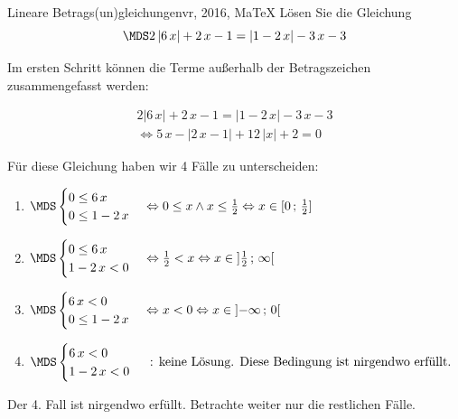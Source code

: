  \providecommand{\MoIl}[1][]{\mbox{}#1]\mathopen{}} 
 \providecommand{\MoIr}[1][]{#1[\mbox{}} 
 \providecommand{\MIntvlSep}{;} 
 \providecommand{\MElSetSep}{\, ; \, } 
 \begin{MAufgabe}{Lineare Betrags(un)gleichungen}{vr, 2016, MaTeX}
L\"osen Sie die Gleichung
$$
 \MDS 2\left| 6\, x \right|+2\, x - 1=  \left| 1 - 2\, x \right|  - 3\, x - 3
$$  

\ifLsg\MLoesung

Im ersten Schritt k\"onnen die Terme au\ss{}erhalb der Betragszeichen zusammengefasst werden:

\begin{align*} 
 2\left| 6\, x \right|+2\, x - 1=  \left| 1 - 2\, x \right|  - 3\, x - 3\\ 
\Leftrightarrow5\, x - \left|2\, x - 1\right| + 12\, \left|x\right| + 2= 0 
 \end{align*}

F\"ur diese Gleichung haben wir 4 F\"alle zu unterscheiden: 
\begin{enumerate}
\item $ \MDS 
\begin{cases} 
 0 \leq 6\, x\\ 
0 \leq 1 - 2\, x
 \end{cases}
\Leftrightarrow 0 \leq x \wedge x \leq \frac{1}{2}\Leftrightarrow x \in [ 0 \, \MIntvlSep \, \frac{1}{2}]$ 
\item $ \MDS 
\begin{cases} 
 0 \leq 6\, x\\ 
1 - 2\, x < 0
 \end{cases}
\Leftrightarrow \frac{1}{2} < x\Leftrightarrow x \in \MoIl  \frac{1}{2} \, \MIntvlSep \, \infty\MoIr $ 
\item $ \MDS 
\begin{cases} 
 6\, x < 0\\ 
0 \leq 1 - 2\, x
 \end{cases}
\Leftrightarrow x < 0\Leftrightarrow x \in \MoIl  -\infty \, \MIntvlSep \, 0\MoIr $ 
\item $ \MDS 
\begin{cases} 
 6\, x < 0\\ 
1 - 2\, x < 0
 \end{cases}
 \mbox{ : keine L\"osung. Diese Bedingung ist nirgendwo erf\"ullt.}$ 
\end{enumerate} 
Der 4. Fall ist nirgendwo erf\"ullt. Betrachte weiter nur die restlichen F\"alle.
 

\end{MAufgabe}
